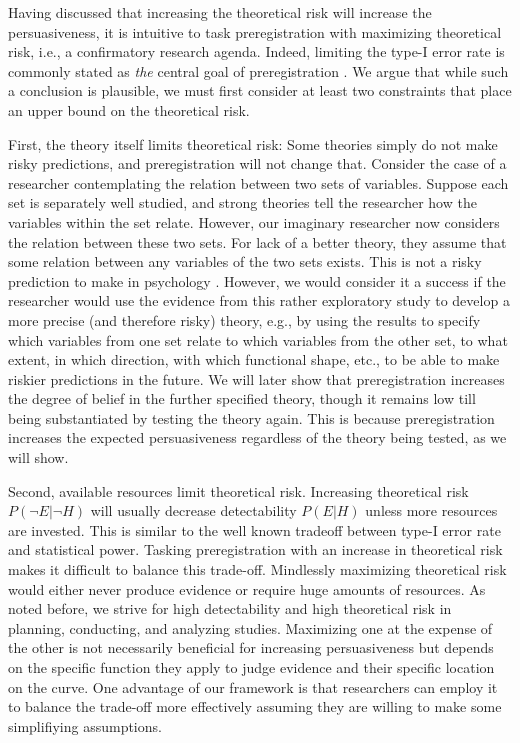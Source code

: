 \documentclass[jou,a4paper]{apa7}
\begin{document}
Having discussed that increasing the theoretical risk will increase the persuasiveness, it is intuitive to task preregistration with maximizing theoretical risk, i.e., a confirmatory research agenda.
Indeed, limiting the type-I error rate is commonly stated as  \textit{the} central goal of preregistration \parencite{nosekPreregistrationRevolution2018,oberauerPreregistrationForkingPath2019,rubinDoesPreregistrationImprove2020}.
We argue that while such a conclusion is plausible, we must first consider at least two constraints that place an upper bound on the theoretical risk.\par
First, the theory itself limits theoretical risk:
Some theories simply do not make risky predictions, and preregistration will not change that.
Consider the case of a researcher contemplating the relation between two sets of variables.
Suppose each set is separately well studied, and strong theories tell the researcher how the variables within the set relate.
However, our imaginary researcher now considers the relation between these two sets.
For lack of a better theory, they assume that some relation between any variables of the two sets exists.
This is not a risky prediction to make in psychology \parencite{orbenCrudReDefined2020}.
However, we would consider it a success if the researcher would use the evidence from this rather exploratory study to develop a more precise (and therefore risky) theory, e.g., by using the results to specify which variables from one set relate to which variables from the other set, to what extent, in which direction, with which functional shape, etc., to be able to make riskier predictions in the future.
We will later show that preregistration increases the degree of belief in the further specified theory, though it remains low till being substantiated by testing the theory again.
This is because preregistration increases the expected persuasiveness regardless of the theory being tested, as we will show.\par
Second, available resources limit theoretical risk.
Increasing theoretical risk $P(\neg{}E|\neg{}H)$ will usually decrease detectability $P(E|H)$ unless more resources are invested.
This is similar to the well known tradeoff between type-I error rate and statistical power.
Tasking preregistration with an increase in theoretical risk makes it difficult to balance this trade-off.
Mindlessly maximizing theoretical risk would either never produce evidence or require huge amounts of resources.
As noted before, we strive for high detectability and high theoretical risk in planning, conducting, and analyzing studies.
Maximizing one at the expense of the other is not necessarily beneficial for increasing persuasiveness but depends on the specific function they apply to judge evidence and their specific location on the curve.
One advantage of our framework is that researchers can employ it to balance the trade-off more effectively assuming they are willing to make some simplifiying assumptions.
\end{document}
